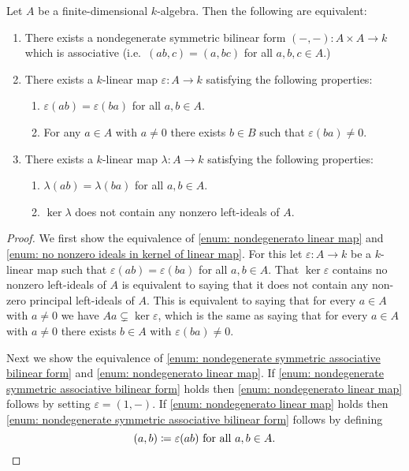 \begin{prop}
  Let $A$ be a finite-dimensional $k$-algebra. Then the following are equivalent:
  \begin{enumerate}[label=\emph{\roman*)},leftmargin=*]
    \item \label{enum: nondegenerate symmetric associative bilinear form}
      There exists a nondegenerate symmetric bilinear form $(-,-) \colon A \times A \to k$ which is associative (i.e.\ $(ab,c) = (a,bc)$ for all $a,b,c \in A$.)
    \item \label{enum: nondegenerato linear map}
      There exists a $k$-linear map $\varepsilon \colon A \to k$ satisfying the following properties:
      \begin{enumerate}[label=\emph{(\roman*)},leftmargin=*]
        \item
          $\varepsilon(ab) = \varepsilon(ba)$ for all $a,b \in A$.
        \item
          For any $a \in A$ with $a \neq 0$ there exists $b \in B$ such that $\varepsilon(ba) \neq 0$.
      \end{enumerate}
    \item \label{enum: no nonzero ideals in kernel of linear map}
      There exists a $k$-linear map $\lambda \colon A \to k$ satisfying the following properties:
      \begin{enumerate}[label=\emph{(\roman*)},leftmargin=*]
        \item
          $\lambda(ab) = \lambda(ba)$ for all $a,b \in A$.
        \item
          $\ker \lambda$ does not contain any nonzero left-ideals of $A$.
      \end{enumerate}
  \end{enumerate}
\end{prop}
\begin{proof}
  We first show the equivalence of \ref{enum: nondegenerato linear map} and \ref{enum: no nonzero ideals in kernel of linear map}. For this let $\varepsilon \colon A \to k$ be a $k$-linear map such that $\varepsilon(ab) = \varepsilon(ba)$ for all $a,b \in A$. That $\ker \varepsilon$ contains no nonzero left-ideals of $A$ is equivalent to saying that it does not contain any non-zero principal left-ideals of $A$. This is equivalent to saying that for every $a \in A$ with $a \neq 0$ we have $Aa \subsetneq \ker \varepsilon$, which is the same as saying that for every $a \in A$ with $a \neq 0$ there exists $b \in A$ with $\varepsilon(ba) \neq 0$.
  
  Next we show the equivalence of \ref{enum: nondegenerate symmetric associative bilinear form} and \ref{enum: nondegenerato linear map}. If \ref{enum: nondegenerate symmetric associative bilinear form} holds then \ref{enum: nondegenerato linear map} follows by setting $\varepsilon = (1,-)$. If \ref{enum: nondegenerato linear map} holds then \ref{enum: nondegenerate symmetric associative bilinear form} follows by defining
  \[
    (a,b) \coloneqq \varepsilon(ab) \text{ for all } a,b \in A.
    \qedhere
  \]
\end{proof}


